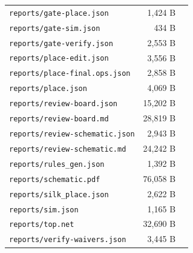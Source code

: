 \documentclass[11pt,a4paper]{article}
\begin{document}
{\begin{longtable}{p{9cm}rp{4cm}}
\texttt{reports/gate-place.json} & 1,424 B &  \\
\texttt{reports/gate-sim.json} & 434 B &  \\
\texttt{reports/gate-verify.json} & 2,553 B &  \\
\texttt{reports/place-edit.json} & 3,556 B &  \\
\texttt{reports/place-final.ops.json} & 2,858 B &  \\
\texttt{reports/place.json} & 4,069 B &  \\
\texttt{reports/review-board.json} & 15,202 B &  \\
\texttt{reports/review-board.md} & 28,819 B &  \\
\texttt{reports/review-schematic.json} & 2,943 B &  \\
\texttt{reports/review-schematic.md} & 24,242 B &  \\
\texttt{reports/rules\_gen.json} & 1,392 B &  \\
\texttt{reports/schematic.pdf} & 76,058 B &  \\
\texttt{reports/silk\_place.json} & 2,622 B &  \\
\texttt{reports/sim.json} & 1,165 B &  \\
\texttt{reports/top.net} & 32,690 B &  \\
\texttt{reports/verify-waivers.json} & 3,445 B &  \\
\bottomrule
\end{longtable}
}
\end{document}
